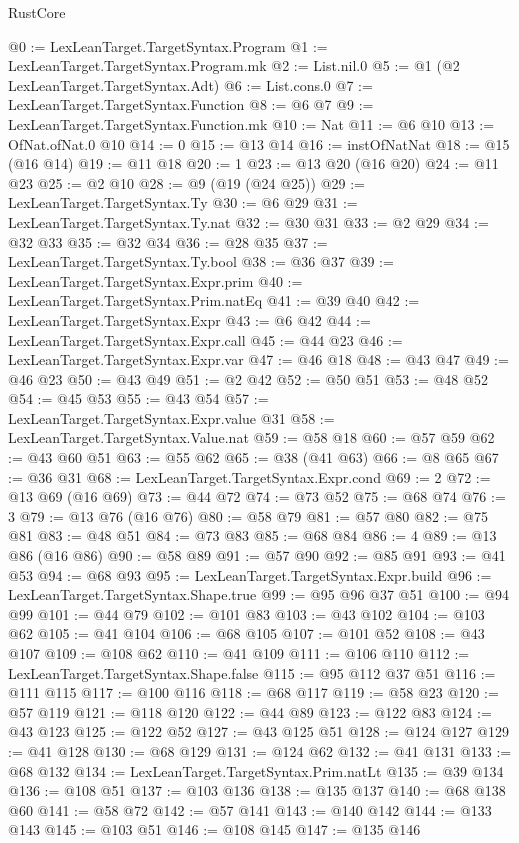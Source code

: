 \begin{lexlean}{RustCore}
\begin{coremodule}
@0 := LexLeanTarget.TargetSyntax.Program
@1 := LexLeanTarget.TargetSyntax.Program.mk
@2 := List.nil.{0}
@5 := @1 (@2 LexLeanTarget.TargetSyntax.Adt)
@6 := List.cons.{0}
@7 := LexLeanTarget.TargetSyntax.Function
@8 := @6 @7
@9 := LexLeanTarget.TargetSyntax.Function.mk
@10 := Nat
@11 := @6 @10
@13 := OfNat.ofNat.{0} @10
@14 := 0
@15 := @13 @14
@16 := instOfNatNat
@18 := @15 (@16 @14)
@19 := @11 @18
@20 := 1
@23 := @13 @20 (@16 @20)
@24 := @11 @23
@25 := @2 @10
@28 := @9 (@19 (@24 @25))
@29 := LexLeanTarget.TargetSyntax.Ty
@30 := @6 @29
@31 := LexLeanTarget.TargetSyntax.Ty.nat
@32 := @30 @31
@33 := @2 @29
@34 := @32 @33
@35 := @32 @34
@36 := @28 @35
@37 := LexLeanTarget.TargetSyntax.Ty.bool
@38 := @36 @37
@39 := LexLeanTarget.TargetSyntax.Expr.prim
@40 := LexLeanTarget.TargetSyntax.Prim.natEq
@41 := @39 @40
@42 := LexLeanTarget.TargetSyntax.Expr
@43 := @6 @42
@44 := LexLeanTarget.TargetSyntax.Expr.call
@45 := @44 @23
@46 := LexLeanTarget.TargetSyntax.Expr.var
@47 := @46 @18
@48 := @43 @47
@49 := @46 @23
@50 := @43 @49
@51 := @2 @42
@52 := @50 @51
@53 := @48 @52
@54 := @45 @53
@55 := @43 @54
@57 := LexLeanTarget.TargetSyntax.Expr.value @31
@58 := LexLeanTarget.TargetSyntax.Value.nat
@59 := @58 @18
@60 := @57 @59
@62 := @43 @60 @51
@63 := @55 @62
@65 := @38 (@41 @63)
@66 := @8 @65
@67 := @36 @31
@68 := LexLeanTarget.TargetSyntax.Expr.cond
@69 := 2
@72 := @13 @69 (@16 @69)
@73 := @44 @72
@74 := @73 @52
@75 := @68 @74
@76 := 3
@79 := @13 @76 (@16 @76)
@80 := @58 @79
@81 := @57 @80
@82 := @75 @81
@83 := @48 @51
@84 := @73 @83
@85 := @68 @84
@86 := 4
@89 := @13 @86 (@16 @86)
@90 := @58 @89
@91 := @57 @90
@92 := @85 @91
@93 := @41 @53
@94 := @68 @93
@95 := LexLeanTarget.TargetSyntax.Expr.build
@96 := LexLeanTarget.TargetSyntax.Shape.true
@99 := @95 @96 @37 @51
@100 := @94 @99
@101 := @44 @79
@102 := @101 @83
@103 := @43 @102
@104 := @103 @62
@105 := @41 @104
@106 := @68 @105
@107 := @101 @52
@108 := @43 @107
@109 := @108 @62
@110 := @41 @109
@111 := @106 @110
@112 := LexLeanTarget.TargetSyntax.Shape.false
@115 := @95 @112 @37 @51
@116 := @111 @115
@117 := @100 @116
@118 := @68 @117
@119 := @58 @23
@120 := @57 @119
@121 := @118 @120
@122 := @44 @89
@123 := @122 @83
@124 := @43 @123
@125 := @122 @52
@127 := @43 @125 @51
@128 := @124 @127
@129 := @41 @128
@130 := @68 @129
@131 := @124 @62
@132 := @41 @131
@133 := @68 @132
@134 := LexLeanTarget.TargetSyntax.Prim.natLt
@135 := @39 @134
@136 := @108 @51
@137 := @103 @136
@138 := @135 @137
@140 := @68 @138 @60
@141 := @58 @72
@142 := @57 @141
@143 := @140 @142
@144 := @133 @143
@145 := @103 @51
@146 := @108 @145
@147 := @135 @146

\end{coremodule}
\end{lexlean}
